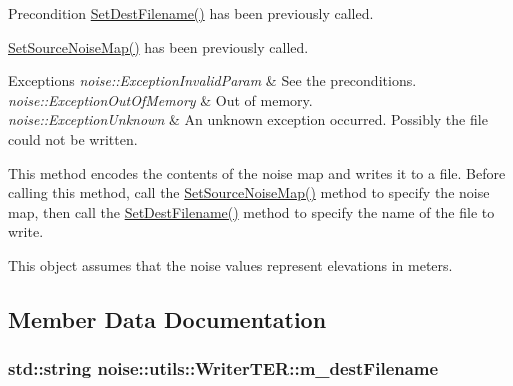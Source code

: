 \begin{DoxyPrecond}{Precondition}
\hyperlink{classnoise_1_1utils_1_1_writer_t_e_r_af8db9e0a480658949ba8d37f4cb03368}{Set\+Dest\+Filename()} has been previously called. 

\hyperlink{classnoise_1_1utils_1_1_writer_t_e_r_a26314e0c188948fa01200a54189c28ca}{Set\+Source\+Noise\+Map()} has been previously called.
\end{DoxyPrecond}

\begin{DoxyExceptions}{Exceptions}
{\em noise\+::\+Exception\+Invalid\+Param} & See the preconditions. \\
\hline
{\em noise\+::\+Exception\+Out\+Of\+Memory} & Out of memory. \\
\hline
{\em noise\+::\+Exception\+Unknown} & An unknown exception occurred. Possibly the file could not be written.\\
\hline
\end{DoxyExceptions}
This method encodes the contents of the noise map and writes it to a file. Before calling this method, call the \hyperlink{classnoise_1_1utils_1_1_writer_t_e_r_a26314e0c188948fa01200a54189c28ca}{Set\+Source\+Noise\+Map()} method to specify the noise map, then call the \hyperlink{classnoise_1_1utils_1_1_writer_t_e_r_af8db9e0a480658949ba8d37f4cb03368}{Set\+Dest\+Filename()} method to specify the name of the file to write.

This object assumes that the noise values represent elevations in meters. 

\subsection{Member Data Documentation}
\hypertarget{classnoise_1_1utils_1_1_writer_t_e_r_af272523bc008f77ad2e98f7d6b631bcc}{
\subsubsection[{m\+\_\+dest\+Filename}]{\setlength{\rightskip}{0pt plus 5cm}std\+::string noise\+::utils\+::\+Writer\+T\+E\+R\+::m\+\_\+dest\+Filename\hspace{0.3cm}{\ttfamily [protected]}}}\label{classnoise_1_1utils_1_1_writer_t_e_r_af272523bc008f77ad2e98f7d6b631bcc}


